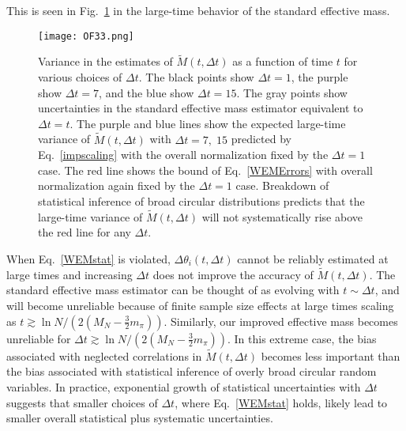This is seen in Fig.~\ref{WEMErrors} in the large-time behavior of the standard effective mass.
%
\begin{figure}[!ht]
  \centering
  \texttt{[image: OF33.png]}
  \caption{
    Variance in the estimates of $\tilde{M}(t, \Delta t)$ as a function of time $t$ for various choices of $\Delta t$. 
  The black points show $\Delta t = 1$, the purple show $\Delta t = 7$, and the blue show $\Delta t = 15$.
  The gray points show uncertainties in the standard effective mass estimator equivalent to $\Delta t = t$. 
  The purple and blue lines show the expected large-time variance of $\tilde{M}(t, \Delta t)$ with $\Delta t =7,\;15$ 
  predicted by Eq.~\eqref{impscaling} with the overall normalization fixed by the $\Delta t =1$ case. 
  The red line shows the bound of Eq.~\eqref{WEMErrors} with overall normalization again fixed by the $\Delta t =1$ case. 
  Breakdown of statistical inference of broad circular distributions predicts that the large-time variance of $\tilde{M}(t, \Delta t)$ 
  will not systematically rise above the red line for any $\Delta t$.
  }
  \label{WEMErrors}
\end{figure}
%


When Eq.~\eqref{WEMstat} is violated, $\Delta \theta_i(t, \Delta t)$ cannot be reliably estimated at large times 
and increasing $\Delta t$ does not improve the accuracy of $\tilde{M}(t, \Delta t)$. 
The standard effective mass estimator can be thought of as evolving with $t \sim \Delta t$, and will become unreliable because of finite sample size effects at large times scaling as $t \gtrsim \ln N / (2(M_N - \frac{3}{2}m_\pi))$.
Similarly, our improved effective mass becomes unreliable for $\Delta t \gtrsim \ln N / (2(M_N - \frac{3}{2}m_\pi))$.
In this extreme case, the bias associated with neglected correlations in $\tilde{M}(t, \Delta t)$ becomes less important than the bias associated with 
statistical inference of overly broad circular random variables. 
In practice, exponential growth of statistical uncertainties with $\Delta t$ suggests that smaller choices of $\Delta t$, 
where Eq.~\eqref{WEMstat} holds, 
likely lead to smaller overall statistical plus systematic uncertainties.


